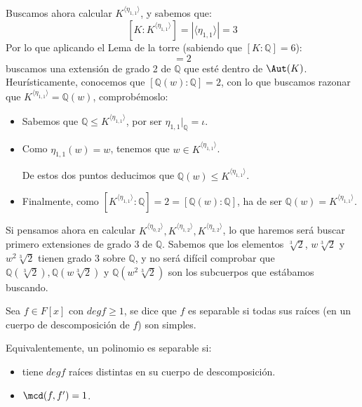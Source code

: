 \begin{ejemplo}
    \noindent
    Buscamos ahora calcular $K^{\langle \eta_{1,1} \rangle }$, y sabemos que:
    \begin{equation*}
        \left[K:K^{\langle \eta_{1,1} \rangle }\right] = |\langle \eta_{1,1} \rangle | = 3
    \end{equation*}
    Por lo que aplicando el Lema de la torre (sabiendo que $[K:\mathbb{Q}] = 6$):
    \begin{equation*}
        [K^{\langle \eta_{1,1} \rangle }:\mathbb{Q}] = 2
    \end{equation*}
    buscamos una extensión de grado 2 de $\mathbb{Q}$ que esté dentro de $\Aut(K)$. Heurísticamente, conocemos que $[\mathbb{Q}(w):\mathbb{Q}] = 2$, con lo que buscamos razonar que $K^{\langle \eta_{1,1} \rangle } = \mathbb{Q}(w)$, comprobémoslo:
    \begin{itemize}
        \item Sabemos que $\mathbb{Q}\leq K^{\langle \eta_{1,1} \rangle }$, por ser $\eta_{1,1}\big|_{\mathbb{Q}} = \iota$.
        \item Como $\eta_{1,1}(w) = w$, tenemos que $w\in K^{\langle \eta_{1,1} \rangle }$.

            De estos dos puntos deducimos que $\mathbb{Q}(w)\leq K^{\langle \eta_{1,1} \rangle }$.
        \item Finalmente, como $[K^{\langle \eta_{1,1} \rangle }:\mathbb{Q}] = 2 = [\mathbb{Q}(w):\mathbb{Q}]$, ha de ser $\mathbb{Q}(w) = K^{\langle \eta_{1,1} \rangle }$.
    \end{itemize}

    \noindent
    Si pensamos ahora en calcular $K^{\langle \eta_{0,2} \rangle }, K^{\langle \eta_{1,2} \rangle }, K^{\langle \eta_{2,2} \rangle }$, lo que haremos será buscar primero extensiones de grado 3 de $\mathbb{Q}$. Sabemos que los elementos $\sqrt[3]{2}$, $w\sqrt[3]{2}$ y $w^2\sqrt[3]{2}$ tienen grado 3 sobre $\mathbb{Q}$, y no será difícil comprobar que $\mathbb{Q}(\sqrt[3]{2}), \mathbb{Q}(w\sqrt[3]{2})$ y $\mathbb{Q}(w^2\sqrt[3]{2})$ son los subcuerpos que estábamos buscando.
\end{ejemplo}

\begin{definicion}
    Sea $f\in F[x]$ con $degf \geq 1$, se dice que $f$ es separable si todas sus raíces (en un cuerpo de descomposición de $f$) son simples.
\end{definicion}

\begin{observacion}
    Equivalentemente, un polinomio es separable si: 
    \begin{itemize}
        \item tiene $degf$ raíces distintas en su cuerpo de descomposición.
        \item $\mcd (f,f') = 1$.
    \end{itemize}
\end{observacion}

